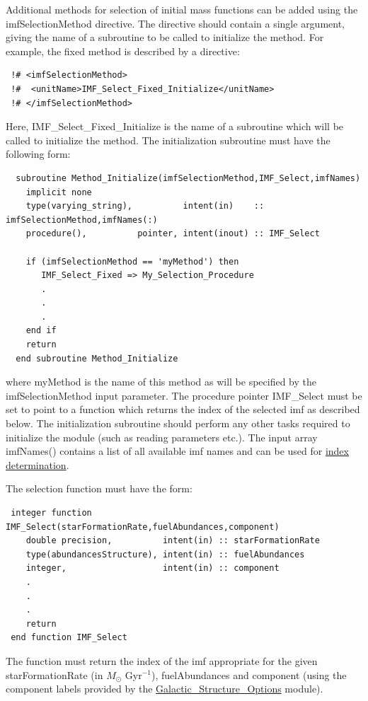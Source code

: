 Additional methods for selection of initial mass functions can be added using the {\normalfont \ttfamily imfSelectionMethod} directive. The directive should contain a single argument, giving the name of a subroutine to be called to initialize the method. For example, the {\normalfont \ttfamily fixed} method is described by a directive:
\begin{verbatim}
 !# <imfSelectionMethod>
 !#  <unitName>IMF_Select_Fixed_Initialize</unitName>
 !# </imfSelectionMethod>
\end{verbatim}
Here, {\normalfont \ttfamily IMF\_Select\_Fixed\_Initialize} is the name of a subroutine which will be called to initialize the method. The initialization subroutine must have the following form:
\begin{verbatim}
  subroutine Method_Initialize(imfSelectionMethod,IMF_Select,imfNames)
    implicit none
    type(varying_string),          intent(in)    :: imfSelectionMethod,imfNames(:)
    procedure(),          pointer, intent(inout) :: IMF_Select

    if (imfSelectionMethod == 'myMethod') then
       IMF_Select_Fixed => My_Selection_Procedure
       .
       .
       .
    end if
    return
  end subroutine Method_Initialize
\end{verbatim}
where {\normalfont \ttfamily myMethod} is the name of this method as will be specified by the {\normalfont \ttfamily imfSelectionMethod} input parameter. The procedure pointer {\normalfont \ttfamily IMF\_Select} must be set to point to a function which returns the index of the selected \gls{imf} as described below. The initialization subroutine should perform any other tasks required to initialize the module (such as reading parameters etc.). The input array {\normalfont \ttfamily imfNames()} contains a list of all available \gls{imf} names and can be used for \hyperlink{star_formation.IMF.utilities.F90:star_formation_imf_utilities:imf_index_lookup}{index determination}.

The selection function must have the form:
\begin{verbatim}
 integer function IMF_Select(starFormationRate,fuelAbundances,component)
    double precision,          intent(in) :: starFormationRate
    type(abundancesStructure), intent(in) :: fuelAbundances
    integer,                   intent(in) :: component
    .
    .
    .
    return
 end function IMF_Select
\end{verbatim}
The function must return the index of the \gls{imf} appropriate for the given {\normalfont \ttfamily starFormationRate} (in $M_\odot$ Gyr$^{-1}$), {\normalfont \ttfamily fuelAbundances} and {\normalfont \ttfamily component} (using the component labels provided by the \hyperlink{galactic_structure.options.F90:galactic_structure_options}{{\normalfont \ttfamily Galactic\_Structure\_Options}} module).

